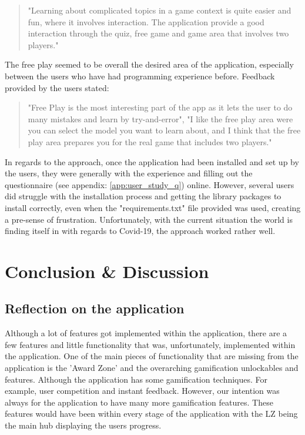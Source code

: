 	\begin{quote}
		\begin{changebar}
			"Learning about complicated topics in a game context is quite easier and fun, where it involves interaction. The application provide a good interaction through the quiz, free game and game area that involves two players." 
		\end{changebar}
	\end{quote}

	The free play seemed to be overall the desired area of the application, especially between the users who have had programming experience before. Feedback provided by the users stated:

	\begin{quote}
		\begin{changebar}
			"Free Play is the most interesting part of the app as it lets the user to do many mistakes and learn by try-and-error", "I like the free play area were you can select the model you want to learn about, and I think that the free play area prepares you for the real game that includes two players."
		\end{changebar}
	\end{quote}


	In regards to the approach, once the application had been installed and set up by the users, they were generally with the experience and filling out the questionnaire (see appendix: \ref{app:user_study_q}) online. However, several users did struggle with the installation process and getting the library packages to install correctly, even when the "requirements.txt" file provided was used, creating a pre-sense of frustration. Unfortunately, with the current situation the world is finding itself in with regards to Covid-19, the approach worked rather well.	


\chapter{Conclusion \& Discussion}
	\section{Reflection on the application}
		Although a lot of features got implemented within the application, there are a few features and little functionality that was, unfortunately, implemented within the application. One of the main pieces of functionality that are missing from the application is the 'Award Zone' and the overarching gamification unlockables and features. Although the application has some gamification techniques. For example, user competition and instant feedback. However, our intention was always for the application to have many more gamification features. These features would have been within every stage of the application with the LZ being the main hub displaying the users progress. 


